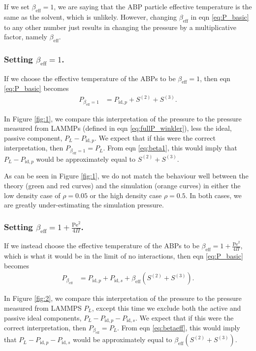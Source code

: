\documentclass[twocolumn,amsmath,amssymb,aps]{revtex4-1}%
\begin{document}
If we set $\beta_{\mathrm{eff}}=1$, we are saying that the ABP particle
effective temperature is the same as the solvent, which is unlikely.
However, changing $\beta_{\mathrm{eff}}$ in eqn \ref{eq:P_basic} to
any other number just results in changing the pressure by a
multiplicative factor, namely $\beta_{\mathrm{eff}}$.

\subsubsection{Setting $\beta_{\mathrm{eff}}=1$.}


If we choose the effective temperature of the ABPs to be
$\beta_{\mathrm{eff}}=1$, then eqn \ref{eq:P_basic} becomes
\begin{align}\label{eq:beta1}
  P_{\beta_{\mathrm{eff}}=1}
  &= P_{\mathrm{id},p}+S^{(2)}+S^{(3)}.
\end{align}

In Figure \ref{fig:1}, we compare this interpretation of the
pressure to the pressure measured from LAMMPs (defined in
eqn \ref{eq:fullP_winkler}), less the ideal, passive component,
$P_L - P_{\mathrm{id},p}$. We expect that if this were the
correct interpretation, then $P_{\beta_{\mathrm{eff}}=1} = P_L$.
From eqn \ref{eq:beta1}, this would imply that
$P_L - P_{\mathrm{id},p}$ would
be approximately equal to $S^{(2)}+S^{(3)}$.

As can be seen in Figure \ref{fig:1}, we do not match the behaviour
well between the theory (green and red curves) and the simulation
(orange curves) in either the low density case of $\rho=0.05$ or
the high density case $\rho = 0.5$. In both cases, we are greatly
under-estimating the simulation pressure.

\subsubsection{Setting $\beta_{\mathrm{eff}}
  = 1 + \frac{\mathrm{Pe}^2}{4\Pi}$.}

If we instead choose the effective temperature of the ABPs to
be $\beta_{\mathrm{eff}} = 1 + \frac{\mathrm{Pe}^2}{4\Pi}$, which
is what it would be in the limit of no interactions, then
eqn \ref{eq:P_basic} becomes
\begin{align}\label{eq:betaeff}
  P_{\beta_{\mathrm{eff}}}
  &= P_{\mathrm{id},p}+P_{\mathrm{id},s}
  +\beta_{\mathrm{eff}}(S^{(2)}+S^{(3)}).
\end{align}

In Figure \ref{fig:2}, we compare this interpretation of the
pressure to the pressure measured from LAMMPS $P_L$, except this time
we exclude both the active and passive ideal components,
$P_L-P_{\mathrm{id},p}-P_{\mathrm{id},s}$. We expect that if this
were the correct interpretation, then
$P_{\beta_{\mathrm{eff}}}=P_L$. From eqn \ref{eq:betaeff},
this would imply that
$P_L-P_{\mathrm{id},p}-P_{\mathrm{id},s}$ would be approximately
equal to $\beta_{\mathrm{eff}}(S^{(2)}+S^{(3)})$.
\end{document}

